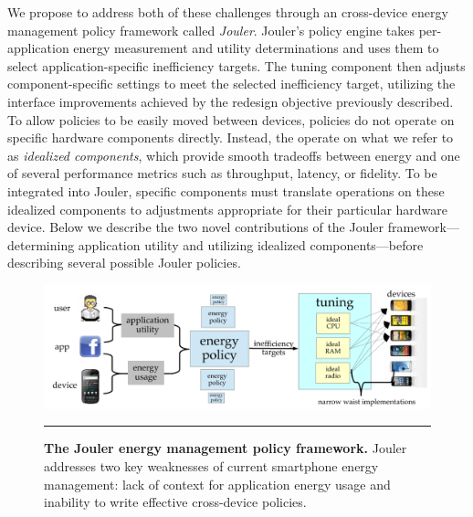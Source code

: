 We propose to address both of these challenges through an cross-device energy
management policy framework called \textit{Jouler}. Jouler's policy engine
takes per-application energy measurement and utility determinations and uses
them to select application-specific inefficiency targets. The tuning
component then adjusts component-specific settings to meet the selected
inefficiency target, utilizing the interface improvements achieved by the
redesign objective previously described. To allow policies to be easily moved
between devices, policies do not operate on specific hardware components
directly. Instead, the operate on what we refer to as \textit{idealized
components}, which provide smooth tradeoffs between energy and one of several
performance metrics such as throughput, latency, or fidelity. To be
integrated into Jouler, specific components must translate operations on
these idealized components to adjustments appropriate for their particular
hardware device. Below we describe the two novel contributions of the Jouler
framework---determining application utility and utilizing idealized
components---before describing several possible Jouler policies.

\begin{figure}
  
  \includegraphics[width=\textwidth]{./figures/jouler.pdf}

  \caption{\textbf{The Jouler energy management policy framework.} Jouler
  addresses two key weaknesses of current smartphone energy management: lack
  of context for application energy usage and inability to write effective
  cross-device policies.}
  
  \vspace*{0.1in}
  \hrule
  \vspace*{-0.1in}
  \label{figure-jouler}

\end{figure}

%
%
%

